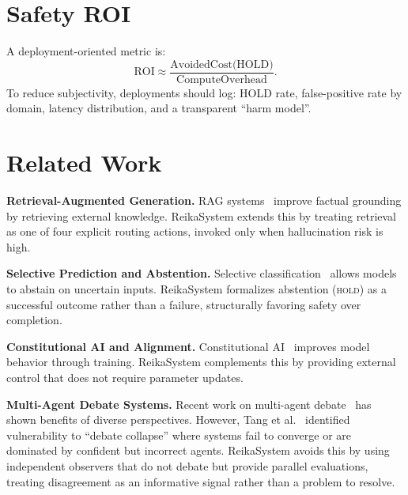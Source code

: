 \documentclass[11pt,a4paper]{article}
\begin{document}
\section{Safety ROI}

A deployment-oriented metric is:
\begin{equation}
\text{ROI} \approx \frac{\text{AvoidedCost(HOLD)}}{\text{ComputeOverhead}}.
\end{equation}
To reduce subjectivity, deployments should log: HOLD rate, false-positive rate by domain,
latency distribution, and a transparent ``harm model''.

\section{Related Work}

\textbf{Retrieval-Augmented Generation.} RAG systems~\cite{lewis2020rag} improve factual
grounding by retrieving external knowledge. ReikaSystem extends this by treating retrieval as
one of four explicit routing actions, invoked only when hallucination risk is high.

\textbf{Selective Prediction and Abstention.} Selective classification~\cite{geifman2017selective}
allows models to abstain on uncertain inputs. ReikaSystem formalizes abstention (\textsc{hold})
as a successful outcome rather than a failure, structurally favoring safety over completion.

\textbf{Constitutional AI and Alignment.} Constitutional AI~\cite{bai2022constitutional}
improves model behavior through training. ReikaSystem complements this by providing external
control that does not require parameter updates.

\textbf{Multi-Agent Debate Systems.} Recent work on multi-agent
debate~\cite{du2023improving} has shown benefits of diverse perspectives. However,
Tang et al.~\cite{tang2024variance} identified vulnerability to ``debate collapse'' where
systems fail to converge or are dominated by confident but incorrect agents. ReikaSystem
avoids this by using independent observers that do not debate but provide parallel
evaluations, treating disagreement as an informative signal rather than a problem to resolve.
\end{document}
